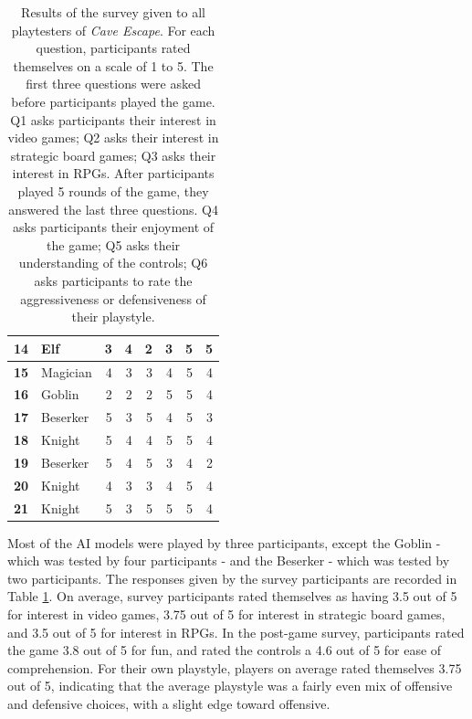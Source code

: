 \begin{table}[hbtp]
\begin{tabular}{|rlrrr|rrr|}
    \midrule
    \textbf{14} & Elf   & 3     & 4     & 2         & 3     & 5     & 5 \\
    \midrule
    \rowcolor[rgb]{ .851,  .851,  .851} \textbf{15} & Magician  & 4     & 3     & 3    & 4     & 5     & 4 \\
    \midrule
    \textbf{16} & Goblin & 2     & 2     & 2      & 5     & 5     & 4 \\
    \midrule
    \rowcolor[rgb]{ .851,  .851,  .851} \textbf{17} & Beserker & 5     & 3     & 5      & 4     & 5     & 3 \\
    \midrule
    \textbf{18} & Knight & 5     & 4     & 4      & 5     & 5     & 4 \\
    \midrule
    \rowcolor[rgb]{ .851,  .851,  .851} \textbf{19} & Beserker & 5     & 4     & 5     & 3     & 4     & 2 \\
    \midrule
    \textbf{20} & Knight & 4     & 3     & 3      & 4     & 5     & 4 \\
    \midrule
    \rowcolor[rgb]{ .851,  .851,  .851} \textbf{21} & Knight & 5     & 3     & 5      & 5     & 5     & 4 \\
    \bottomrule
  \end{tabular}%
  \caption{Results of the survey given to all playtesters of \textit{Cave Escape}. For each question, participants rated themselves on a scale of 1 to 5. The first three questions were asked before participants played the game. Q1 asks participants their interest in video games; Q2 asks their interest in strategic board games; Q3 asks their interest in RPGs. After participants played 5 rounds of the game, they answered the last three questions. Q4 asks participants their enjoyment of the game; Q5 asks their understanding of the controls; Q6 asks participants to rate the aggressiveness or defensiveness of their playstyle.}
  \label{tab:survey}%
\end{table}%

Most of the AI models were played by three participants, except the Goblin - which was tested by four participants - and the Beserker - which was tested by two participants. The responses given by the survey participants are recorded in Table \ref{tab:survey}. On average, survey participants rated themselves as having 3.5 out of 5 for interest in video games, 3.75 out of 5 for interest in strategic board games, and 3.5 out of 5 for interest in RPGs. In the post-game survey, participants rated the game 3.8 out of 5 for fun, and rated the controls a 4.6 out of 5 for ease of comprehension. For their own playstyle, players on average rated themselves 3.75 out of 5, indicating that the average playstyle was a fairly even mix of offensive and defensive choices, with a slight edge toward offensive.\\

